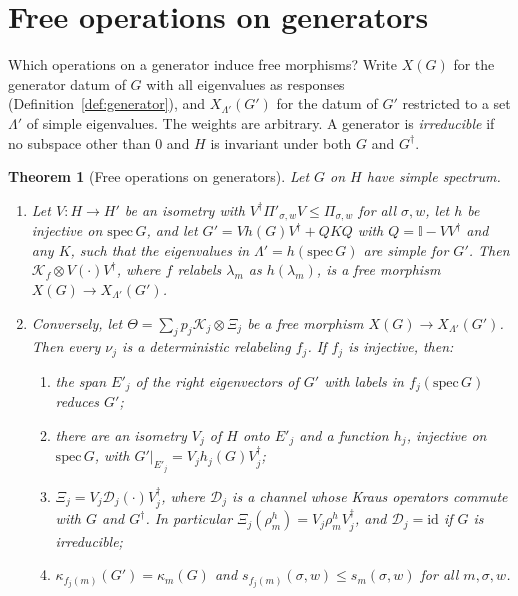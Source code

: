 \documentclass[11pt]{article}
\newtheorem{theorem}{Theorem}
\theoremstyle{definition}
\theoremstyle{remark}
\newcommand{\one}{\mathbb{I}}
\begin{document}
\section{Free operations on generators}
\label{sec:gen}

Which operations on a generator induce free morphisms? Write $X(G)$ for the generator datum of $G$ with all eigenvalues as responses (Definition~\ref{def:generator}), and $X_{\Lambda'}(G')$ for the datum of $G'$ restricted to a set $\Lambda'$ of simple eigenvalues. The weights are arbitrary. A generator is \emph{irreducible} if no subspace other than $0$ and $H$ is invariant under both $G$ and $G^\dagger$.

\begin{theorem}[Free operations on generators]\label{thm:gen}
Let $G$ on $H$ have simple spectrum.
\begin{enumerate}
\item[(a)] Let $V:H\to H'$ be an isometry with $V^\dagger\Pi'_{\sigma,w}V\le\Pi_{\sigma,w}$ for all $\sigma,w$, let $h$ be injective on $\mathrm{spec}\,G$, and let $G'=Vh(G)V^\dagger+QKQ$ with $Q=\one-VV^\dagger$ and any $K$, such that the eigenvalues in $\Lambda'=h(\mathrm{spec}\,G)$ are simple for $G'$. Then $\mathcal K_f\otimes V(\cdot)V^\dagger$, where $f$ relabels $\lambda_m$ as $h(\lambda_m)$, is a free morphism $X(G)\to X_{\Lambda'}(G')$.
\item[(b)] Conversely, let $\Theta=\sum_jp_j\mathcal K_j\otimes\Xi_j$ be a free morphism $X(G)\to X_{\Lambda'}(G')$. Then every $\nu_j$ is a deterministic relabeling $f_j$. If $f_j$ is injective, then:
\begin{enumerate}
\item[(i)] the span $E'_j$ of the right eigenvectors of $G'$ with labels in $f_j(\mathrm{spec}\,G)$ reduces $G'$;
\item[(ii)] there are an isometry $V_j$ of $H$ onto $E'_j$ and a function $h_j$, injective on $\mathrm{spec}\,G$, with $G'|_{E'_j}=V_jh_j(G)V_j^\dagger$;
\item[(iii)] $\Xi_j=V_j\mathcal D_j(\cdot)V_j^\dagger$, where $\mathcal D_j$ is a channel whose Kraus operators commute with $G$ and $G^\dagger$. In particular $\Xi_j(\rho^h_m)=V_j\rho^h_mV_j^\dagger$, and $\mathcal D_j=\mathrm{id}$ if $G$ is irreducible;
\item[(iv)] $\kappa_{f_j(m)}(G')=\kappa_m(G)$ and $s_{f_j(m)}(\sigma,w)\le s_m(\sigma,w)$ for all $m,\sigma,w$.
\end{enumerate}
\end{enumerate}
\end{theorem}
\end{document}

